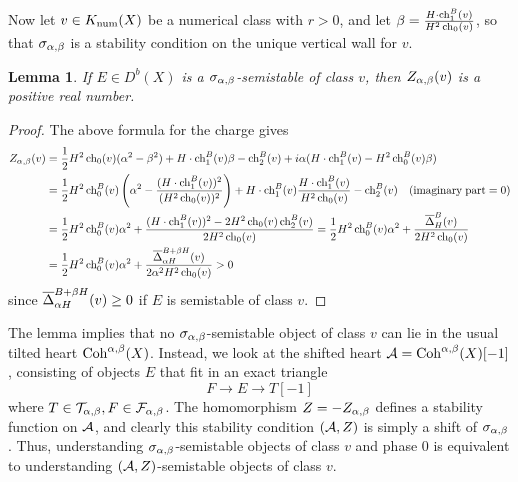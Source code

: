 \documentclass[letterpaper,10pt]{article}
\newtheorem{lem}[thm]{Lemma}
\begin{document}
Now let $v \in K_{\mathrm{num}}(X)$ be a numerical class with $r > 0$, and let $\beta = \frac{H \cdot \operatorname{\mathrm{ch}}_1^B(v)}{H^2 \operatorname{\mathrm{ch}}_0(v)}$, so that $\sigma_{\alpha, \beta}$ is a stability condition on the unique vertical wall for $v$. 
\begin{lem}
    If $E \in D^b(X)$ is a $\sigma_{\alpha, \beta}$-semistable of class $v$, then $Z_{\alpha,\beta}(v)$ is a positive real number.
\end{lem}
\begin{proof}
    The above formula for the charge gives
    \begin{align*}
        Z_{\alpha, \beta}(v) & = \frac{1}{2}H^2 \operatorname{\mathrm{ch}}_0(v) (\alpha^2 - \beta^2) + H\cdot \operatorname{\mathrm{ch}}_1^B(v) \beta - \operatorname{\mathrm{ch}}_2^B(v) + i \alpha (H \cdot \operatorname{\mathrm{ch}}_1^B(v) - H^2 \operatorname{\mathrm{ch}}_0^B(v) \beta) \\
        & = \frac{1}{2} H^2 \operatorname{\mathrm{ch}}_0^B(v)\left(\alpha^2 - \frac{(H\cdot \operatorname{\mathrm{ch}}_1^B(v))^2}{(H^2 \operatorname{\mathrm{ch}}_0(v))^2} \right) + H \cdot \operatorname{\mathrm{ch}}_1^B(v)\frac{H \cdot \operatorname{\mathrm{ch}}_1^B(v)}{H^2 \operatorname{\mathrm{ch}}_0(v)} - \operatorname{\mathrm{ch}}_2^B(v) \quad (\mathrm{imaginary\; part} = 0) \\
        & = \frac{1}{2} H^2 \operatorname{\mathrm{ch}}_0^B(v) \alpha^2 + \frac{(H\cdot \operatorname{\mathrm{ch}}_1^B(v))^2 - 2 H^2 \operatorname{\mathrm{ch}}_0(v) \operatorname{\mathrm{ch}}_2^B(v)}{2 H^2 \operatorname{\mathrm{ch}}_0(v)} = \frac{1}{2} H^2 \operatorname{\mathrm{ch}}_0^B(v) \alpha^2 + \frac{\overline{\Delta}_H^B(v)}{2 H^2 \operatorname{\mathrm{ch}}_0(v)} \\
        & = \frac{1}{2} H^2 \operatorname{\mathrm{ch}}_0^B(v) \alpha^2 + \frac{\overline{\Delta}_{\alpha H}^{B + \beta H}(v)}{2 \alpha^2 H^2 \operatorname{\mathrm{ch}}_0(v)} > 0
    \end{align*}
    since $\overline{\Delta}_{\alpha H}^{B + \beta H}(v) \ge 0$ if $E$ is semistable of class $v$. 
\end{proof}
The lemma implies that no $\sigma_{\alpha,\beta}$-semistable object of class $v$ can lie in the usual tilted heart $\mathrm{Coh}^{\alpha, \beta}(X)$. Instead, we look at the shifted heart $\mathcal{A} = \mathrm{Coh}^{\alpha, \beta}(X)[-1]$, consisting of objects $E$ that fit in an exact triangle
\[ F \to E \to T[-1] \]
where $T \in \mathcal{T}_{\alpha, \beta}, F \in \mathcal{F}_{\alpha,\beta}$. The homomorphism $Z = - Z_{\alpha, \beta}$ defines a stability function on $\mathcal{A}$, and clearly this stability condition $(\mathcal{A}, Z)$ is simply a shift of $\sigma_{\alpha, \beta}$. Thus, understanding $\sigma_{\alpha,\beta}$-semistable objects of class $v$ and phase 0 is equivalent to understanding $(\mathcal{A}, Z)$-semistable objects of class $v$.
\end{document}
